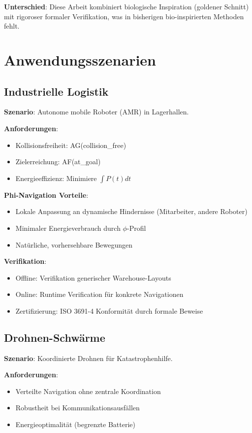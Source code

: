 ﻿\documentclass[a4paper,12pt]{article}
\theoremstyle{definition}
\begin{document}
\textbf{Unterschied}: Diese Arbeit kombiniert biologische Inspiration (goldener Schnitt) mit rigoroser formaler Verifikation, was in bisherigen bio-inspirierten Methoden fehlt.

\section{Anwendungsszenarien}

\subsection{Industrielle Logistik}

\textbf{Szenario}: Autonome mobile Roboter (AMR) in Lagerhallen.

\textbf{Anforderungen}:
\begin{itemize}
	\item Kollisionsfreiheit: AG(collision\_free)
	\item Zielerreichung: AF(at\_goal)
	\item Energieeffizienz: Minimiere $\int P(t) dt$
\end{itemize}

\textbf{Phi-Navigation Vorteile}:
\begin{itemize}
	\item Lokale Anpassung an dynamische Hindernisse (Mitarbeiter, andere Roboter)
	\item Minimaler Energieverbrauch durch $\phi$-Profil
	\item Natürliche, vorhersehbare Bewegungen
\end{itemize}

\textbf{Verifikation}:
\begin{itemize}
	\item Offline: Verifikation generischer Warehouse-Layouts
	\item Online: Runtime Verification für konkrete Navigationen
	\item Zertifizierung: ISO 3691-4 Konformität durch formale Beweise
\end{itemize}

\subsection{Drohnen-Schwärme}

\textbf{Szenario}: Koordinierte Drohnen für Katastrophenhilfe.

\textbf{Anforderungen}:
\begin{itemize}
	\item Verteilte Navigation ohne zentrale Koordination
	\item Robustheit bei Kommunikationsausfällen
	\item Energieoptimalität (begrenzte Batterie)
\end{itemize}
\end{document}
